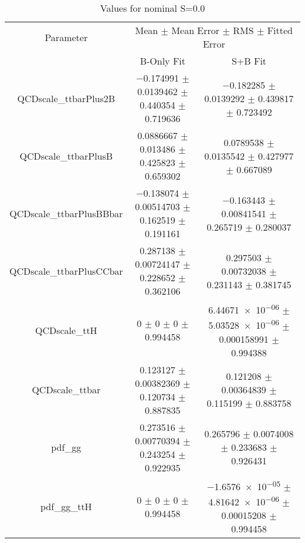 \begin{table}
\centering
\caption{Values for nominal S=0.0}
\begin{tabular}{ccc}
\toprule
Parameter & \multicolumn{2}{c}{Mean $\pm$ Mean Error $\pm$ RMS $\pm$ Fitted Error}\\
 & B-Only Fit & S+B Fit\\
\midrule
QCDscale\_ttbarPlus2B & \num{-0.174991} $\pm$ \num{0.0139462} $\pm$ \num{0.440354} $\pm$ \num{0.719636} & \num{-0.182285} $\pm$ \num{0.0139292} $\pm$ \num{0.439817} $\pm$ \num{0.723492}\\
QCDscale\_ttbarPlusB & \num{0.0886667} $\pm$ \num{0.013486} $\pm$ \num{0.425823} $\pm$ \num{0.659302} & \num{0.0789538} $\pm$ \num{0.0135542} $\pm$ \num{0.427977} $\pm$ \num{0.667089}\\
QCDscale\_ttbarPlusBBbar & \num{-0.138074} $\pm$ \num{0.00514703} $\pm$ \num{0.162519} $\pm$ \num{0.191161} & \num{-0.163443} $\pm$ \num{0.00841541} $\pm$ \num{0.265719} $\pm$ \num{0.280037}\\
QCDscale\_ttbarPlusCCbar & \num{0.287138} $\pm$ \num{0.00724147} $\pm$ \num{0.228652} $\pm$ \num{0.362106} & \num{0.297503} $\pm$ \num{0.00732038} $\pm$ \num{0.231143} $\pm$ \num{0.381745}\\
QCDscale\_ttH & \num{0} $\pm$ \num{0} $\pm$ \num{0} $\pm$ \num{0.994458} & \num{6.44671e-06} $\pm$ \num{5.03528e-06} $\pm$ \num{0.000158991} $\pm$ \num{0.994388}\\
QCDscale\_ttbar & \num{0.123127} $\pm$ \num{0.00382369} $\pm$ \num{0.120734} $\pm$ \num{0.887835} & \num{0.121208} $\pm$ \num{0.00364839} $\pm$ \num{0.115199} $\pm$ \num{0.883758}\\
pdf\_gg & \num{0.273516} $\pm$ \num{0.00770394} $\pm$ \num{0.243254} $\pm$ \num{0.922935} & \num{0.265796} $\pm$ \num{0.0074008} $\pm$ \num{0.233683} $\pm$ \num{0.926431}\\
pdf\_gg\_ttH & \num{0} $\pm$ \num{0} $\pm$ \num{0} $\pm$ \num{0.994458} & \num{-1.6576e-05} $\pm$ \num{4.81642e-06} $\pm$ \num{0.00015208} $\pm$ \num{0.994458}\\
\bottomrule
\end{tabular}
\end{table}